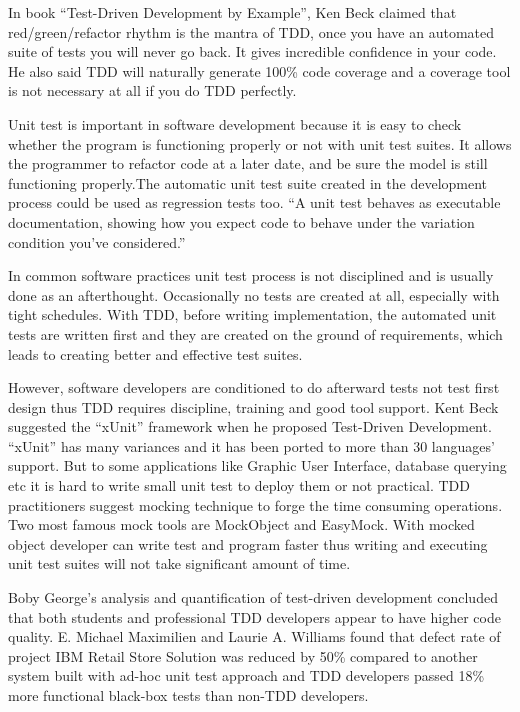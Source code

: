 In book ``Test-Driven Development by Example'', Ken Beck claimed that
red/green/refactor rhythm is the mantra of TDD, once you have an automated
suite of tests you will never go back. It gives incredible confidence in
your code. He also said TDD will naturally generate 100\% code coverage and a
coverage tool is not necessary at all if you do TDD perfectly.

Unit test is important in software development because it is easy to check
whether the program is functioning properly or not with unit test
suites. It allows the programmer to refactor code at a later date, and be
sure the model is still functioning properly\cite{UnitTest}.The automatic
unit test suite created in the development process could be used as
regression tests too. ``A unit test behaves as executable documentation,
showing how you expect code to behave under the variation condition you've
considered.''\cite{Andy&Dave_2003}

In common software practices unit test process is not disciplined and is
usually done as an afterthought. Occasionally no tests are created at all,
especially with tight schedules. With TDD, before writing implementation,
the automated unit tests are written first and they are created on the
ground of requirements, which leads to creating better and effective test
suites.
  
However, software developers are conditioned to do afterward tests not test
first design thus TDD requires discipline, training and good tool
support. Kent Beck suggested the ``xUnit'' framework when he proposed
Test-Driven Development. ``xUnit'' has many variances and it has been
ported to more than 30 languages' support\cite{XPSoftware}. But to some
applications like Graphic User Interface, database querying etc it is hard to
write small unit test to deploy them or not practical. TDD practitioners
suggest mocking technique to forge the time consuming operations. Two most
famous mock tools are MockObject and EasyMock. With mocked object developer
can write test and program faster thus writing and executing unit test
suites will not take significant amount of time.

Boby George's analysis and quantification of test-driven development
concluded that both students and professional TDD developers appear to have
higher code quality\cite{George_2002}. E. Michael Maximilien and Laurie
A. Williams found that defect rate of project IBM Retail Store
Solution was reduced by 50\% compared to another system built with ad-hoc
unit test approach \cite{Maximilien_2003} and TDD developers passed 18\% more
functional black-box tests than non-TDD developers. 

